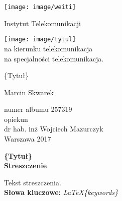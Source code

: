 
\begin{titlepage}
\begin{center}
	\texttt{[image: image/weiti]}
	\setmainfont[Ligatures=TeX]{Helvetica}
	\vspace{0.7cm}
	\begingroup
	\fontsize{12pt}{12pt}\selectfont
		\begin{center}
			Instytut Telekomunikacji
		\end{center}
	\endgroup
	\vspace{0.7cm}
	\texttt{[image: image/tytul]}\\
	\vspace{0.3cm}
	na kierunku telekomunikacja\\
	na specjalności telekomunikacja.\\
	\vspace{1.2cm}
	\begingroup
	\fontsize{14pt}{12pt}\selectfont
	\begin{center}
	 	\{Tytuł\}\\
	\end{center}
	\endgroup
	\vspace{2.3cm}


	\begingroup
	\fontsize{21pt}{12pt}\selectfont
	\begin{center}
		Marcin Skwarek
	\end{center}
	\endgroup

		\begingroup
	\fontsize{12pt}{12pt}\selectfont
	\begin{center}
		numer albumu 257319\\
		\vspace{0.9cm}
		opiekun\\
		dr hab. inż Wojciech Mazurczyk\\
		\vspace{6.8cm}
		Warszawa 2017
	\end{center}
	\endgroup
\end{center}
\end{titlepage}

\afterpage{\null\newpage}

\clearpage
{}
\newpage
\clearpage
{}
\begin{center}
	\fontsize{18pt}{12pt}\selectfont\textbf{\{Tytuł\}}\\
	\vspace{1cm}
	\fontsize{14pt}{12pt}\selectfont
	\textbf{Streszczenie}
\end{center}
Tekst streszczenia.\\
\noindent\textbf{Słowa kluczowe:} \textit{\LaTeX \{keywords\}}\\
\vspace{1.5cm}


